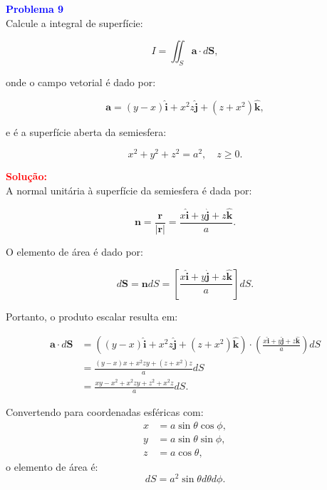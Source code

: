 \documentclass[a4paper,12pt]{article}
\begin{document}
\begin{flushleft}
\textbf{\textcolor{blue}{\Large Problema 9}}\\
Calcule a integral de superfície:

\begin{equation}
I = \iint_S \mathbf{a} \cdot d\mathbf{S},
\end{equation}

onde o campo vetorial  é dado por:

\begin{equation}
\mathbf{a} = (y - x) \hat{\mathbf{i}} + x^2z \hat{\mathbf{j}} + (z + x^2) \hat{\mathbf{k}},
\end{equation}

e  é a superfície aberta da semiesfera:

\begin{equation}
x^2 + y^2 + z^2 = a^2, \quad z \geq 0.
\end{equation}

\textcolor{red}{\textbf{Solução:}}\\

A normal unitária à superfície da semiesfera é dada por:

\begin{equation}
\mathbf{n} = \frac{\mathbf{r}}{|\mathbf{r}|} = \frac{x \hat{\mathbf{i}} + y \hat{\mathbf{j}} + z \hat{\mathbf{k}}}{a}.
\end{equation}

O elemento de área é dado por:

\begin{equation}
d\mathbf{S} = \mathbf{n}dS = \left[ \frac{x \hat{\mathbf{i}} + y \hat{\mathbf{j}} + z \hat{\mathbf{k}}}{a}\right]dS.
\end{equation}

Portanto, o produto escalar  resulta em:

\begin{align}
\mathbf{a} \cdot d\mathbf{S} &= \left( (y - x) \hat{\mathbf{i}} + x^2z \hat{\mathbf{j}} + (z + x^2) \hat{\mathbf{k}} \right) \cdot \left( \frac{x \hat{\mathbf{i}} + y \hat{\mathbf{j}} + z \hat{\mathbf{k}}}{a} \right) dS \\
&= \frac{(y - x)x + x^2z y + (z + x^2)z}{a} dS \\
&= \frac{xy - x^2 + x^2 z y + z^2 + x^2 z}{a} dS.
\end{align}

Convertendo para coordenadas esféricas com:
\begin{align}
x &= a \sin \theta \cos \phi, \\
y &= a \sin \theta \sin \phi, \\
z &= a \cos \theta,
\end{align}
o elemento de área é:
\begin{equation}
dS = a^2 \sin \theta d\theta d\phi.
\end{equation}


\end{flushleft}
\end{document}
